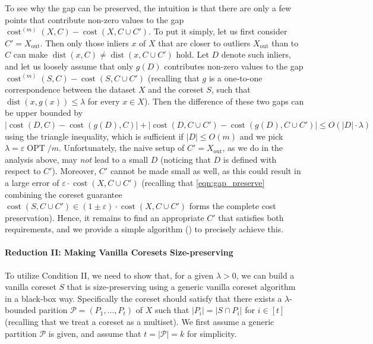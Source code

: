 \documentclass[letterpaper,11pt]{article}
\theoremstyle{plain}
\theoremstyle{definition}
\theoremstyle{remark}
\DeclareMathOperator{\cost}{cost}
\DeclareMathOperator{\OPT}{OPT}
\DeclareMathOperator{\dist}{dist}
\newcommand{\out}{\mathrm{out}}
\newcommand{\eps}{\varepsilon}
\newcommand{\calP}{\mathcal{P}}
\begin{document}
To see why the gap can be preserved,
the intuition is that there are only a few points that contribute non-zero values to the gap $ \cost^{(m)}(X,C) - \cost(X,C \cup C') $.
To put it simply, let us first consider $C' = X_{\out}$. Then only those inliers $x$ of $X$ that are closer to outliers $X_{\out}$ than to $C$ can make $\dist(x, C) \neq \dist(x, C \cup C')$ hold. Let $D$ denote such inliers, and let us loosely assume that only $g(D)$ contributes non-zero values to the gap $\cost^{(m)}(S,C) - \cost(S,C \cup C')$ (recalling that $g$ is a one-to-one correspondence between the dataset $X$ and the coreset $S$, such that $\dist(x, g(x)) \leq \lambda$ for every $x \in X$).
Then the difference of these two gaps can be upper bounded by $|\cost(D,C) - \cost(g(D),C)| + |\cost(D,C\cup C') - \cost(g(D),C\cup C')|\le O(|D|\cdot \lambda)$ using the triangle inequality, which is sufficient if $|D|\le O(m)$ and we pick $\lambda = \eps\OPT/m$.
Unfortunately, the naive setup of $C' = X_\out$, as we do in the analysis above, may \emph{not} lead to a small $D$ (noticing that $D$ is defined with respect to $C'$). 
Moreover, $C'$ cannot be made small as well, as this could result in a large error of $\eps \cdot \cost(X, C \cup C')$ (recalling that \eqref{eqn:gap_preserve} combining the coreset guarantee $\cost(S,C\cup C')\in (1\pm \eps)\cdot \cost(X,C\cup C')$ forms the complete cost preservation).
Hence, it remains to find an appropriate $C'$ that satisfies both requirements, and we provide a simple algorithm () to precisely achieve this.



















\paragraph{Reduction II: Making Vanilla Coresets Size-preserving}
To utilize Condition II, we need to show that, for a given $\lambda > 0$, we can build a vanilla coreset $S$ that is size-preserving using a generic vanilla coreset algorithm in a black-box way. Specifically the coreset should satisfy that there exists a $\lambda$-bounded parition $\calP=(P_1,\dots,P_t)$ of $X$
such that 
$|P_i| = |S\cap P_i|$ for $i\in [t]$ (recalling that we treat a coreset as a multiset).
We first assume a generic partition $\calP$ is given, and assume that $t=|\calP| = k$ for simplicity. 
\end{document}
